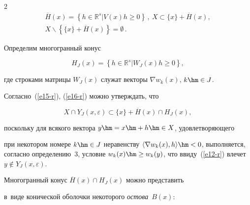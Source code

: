 \begin{multicols}{2}
\begin{multline}
  \overline{H}(x)=\left\{ h\in \mathbb{R}^s\vert V(x)h\geq 0\right\}\,,\


  X\subset \{x\} +\overline{H}(x),\\


  X\backslash \left\{ \{x\} +\overline{H}(x)\right\}=\emptyset\,.


  \label{e15-r}


  \end{multline}


  


  Определим многогранный конус


  \begin{equation}


  H_J(x)=\left\{ h\in \mathbb{R}^s\vert W_J(x) h\geq 0\right\},


  \label{e16-r}


  \end{equation}


где строками матрицы $W_J(x)$ служат векторы $\nabla w_k(x)$, $k\hm\in J$. 


Согласно~(\ref{e15-r}), (\ref{e16-r}) мож\-но утверж\-дать, что


\begin{equation}


X\cap Y_J(x,\varepsilon) \subset \{x\} +\overline{H}(x)\cap H_J(x),


\label{e17-r}


\end{equation}


поскольку для всякого вектора $y\hm= x\hm+ h \hm\in X$, удовле\-тво\-ря\-юще\-го 


при некотором номере $k\hm\in J$ неравенству $\langle \nabla w_k(x),h\rangle 


\hm<0$, выполняется, согласно определению~3, условие $w_k(x)\hm\geq 


w_k(y)$, что ввиду~(\ref{e12-r}) влечет $y\not\in Y_J(x,\varepsilon)$.





  Многогранный конус $\overline{H}(x)\cap H_J(x)$ можно представить 


в~виде конической оболочки некоторого \textit{остова}~$B(x)$: 





\vspace*{-6pt}






\end{multicols}
